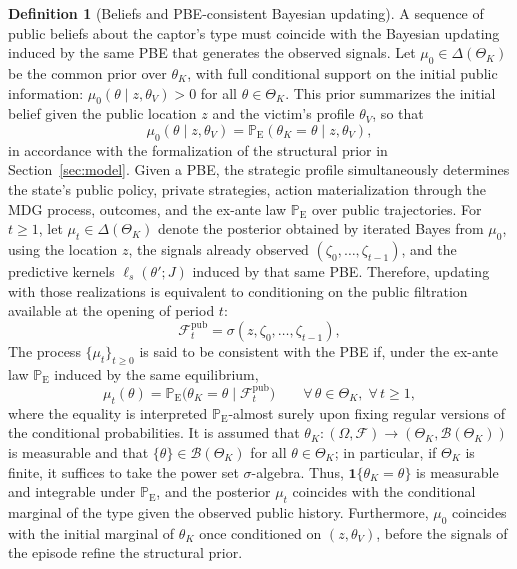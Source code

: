 \documentclass[ecta,nameyear,draft]{econsocart}
\theoremstyle{plain}
\theoremstyle{definition}
\newtheorem{definition}[theorem]{Definition}
\newcommand{\ProbE}{\mathbb{P}_{\mathrm{E}}}
\newcommand{\ThetaK}{\Theta_K}
\newcommand{\1}{\mathbf{1}}
\begin{document}
\begin{definition}[Beliefs and PBE-consistent Bayesian updating]\label{def:beliefs-martingale}
A sequence of public beliefs about the captor's type must coincide with the Bayesian updating induced by the same PBE that generates the observed signals. Let $\mu_0\in\Delta(\ThetaK)$ be the common prior over $\theta_K$, with full conditional support on the initial public information: $\mu_0(\theta \mid z,\theta_V)>0$ for all $\theta\in\ThetaK$. This prior summarizes the initial belief given the public location $z$ and the victim's profile $\theta_V$, so that
\[
\mu_0(\theta \mid z,\theta_V)=\ProbE(\theta_K=\theta\mid z,\theta_V),
\]
in accordance with the formalization of the structural prior in Section~\ref{sec:model}. Given a PBE, the strategic profile simultaneously determines the state's public policy, private strategies, action materialization through the MDG process, outcomes, and the ex-ante law $\ProbE$ over public trajectories. For $t\ge 1$, let $\mu_t\in\Delta(\ThetaK)$ denote the posterior obtained by iterated Bayes from $\mu_0$, using the location $z$, the signals already observed $(\zeta_0,\ldots,\zeta_{t-1})$, and the predictive kernels $\ell_s(\theta';J)$ induced by that same PBE. Therefore, updating with those realizations is equivalent to conditioning on the public filtration available at the opening of period $t$:
\[
\mathcal{F}_t^{\mathrm{pub}}=\sigma(z,\zeta_0,\ldots,\zeta_{t-1}),
\]
The process $\{\mu_t\}_{t\ge 0}$ is said to be consistent with the PBE if, under the ex-ante law $\ProbE$ induced by the same equilibrium,
\begin{equation}
\label{eq:beliefs-ebp-consistency}
\mu_t(\theta)=\ProbE\bigl(\theta_K=\theta\mid\mathcal{F}_t^{\mathrm{pub}}\bigr)\qquad \forall\,\theta\in\ThetaK,\;\forall\,t\ge 1,
\end{equation}
where the equality is interpreted $\ProbE$-almost surely upon fixing regular versions of the conditional probabilities. It is assumed that $\theta_K:(\Omega,\mathcal{F})\to(\ThetaK,\mathcal{B}(\ThetaK))$ is measurable and that $\{\theta\}\in\mathcal{B}(\ThetaK)$ for all $\theta\in\ThetaK$; in particular, if $\ThetaK$ is finite, it suffices to take the power set $\sigma$-algebra. Thus, $\mathbf{1}\{\theta_K=\theta\}$ is measurable and integrable under $\ProbE$, and the posterior $\mu_t$ coincides with the conditional marginal of the type given the observed public history. Furthermore, $\mu_0$ coincides with the initial marginal of $\theta_K$ once conditioned on $(z, \theta_V)$, before the signals of the episode refine the structural prior.
\end{definition}
\end{document}
